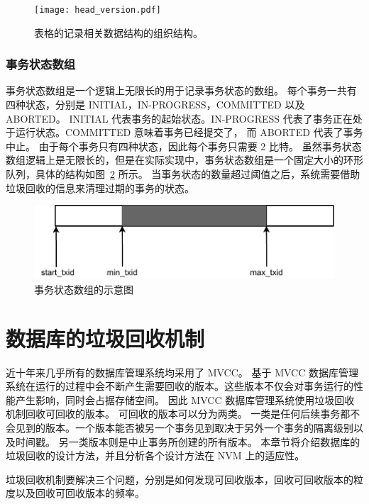 \begin{figure}
    \centering
    \texttt{[image: head\_version.pdf]}
    \caption{表格的记录相关数据结构的组织结构。}
    \label{fig:table}
\end{figure}

\subsubsection{事务状态数组}

事务状态数组是一个逻辑上无限长的用于记录事务状态的数组。
每个事务一共有四种状态，分别是 INITIAL，IN-PROGRESS，COMMITTED 以及 ABORTED。
INITIAL 代表事务的起始状态。IN-PROGRESS 代表了事务正在处于运行状态。COMMITTED 意味着事务已经提交了，
而 ABORTED 代表了事务中止。
由于每个事务只有四种状态，因此每个事务只需要 2 比特。
虽然事务状态数组逻辑上是无限长的，但是在实际实现中，事务状态数组是一个固定大小的环形队列，具体的结构如图~\ref{fig:clog} 所示。
当事务状态的数量超过阈值之后，系统需要借助垃圾回收的信息来清理过期的事务的状态。

\begin{figure}
    \centering
    \includegraphics[width=1\linewidth]{figures/clog.pdf}
    \caption{事务状态数组的示意图}
    \label{fig:clog}
\end{figure}




\section{数据库的垃圾回收机制}

近十年来几乎所有的数据库管理系统均采用了 MVCC。
基于 MVCC 数据库管理系统在运行的过程中会不断产生需要回收的版本。这些版本不仅会对事务运行的性能产生影响，同时会占据存储空间。
因此 MVCC 数据库管理系统使用垃圾回收机制回收可回收的版本。
可回收的版本可以分为两类。
一类是任何后续事务都不会见到的版本。一个版本能否被另一个事务见到取决于另外一个事务的隔离级别以及时间戳。
另一类版本则是中止事务所创建的所有版本。
本章节将介绍数据库的垃圾回收的设计方法，并且分析各个设计方法在 NVM 上的适应性。

垃圾回收机制要解决三个问题，分别是如何发现可回收版本，回收可回收版本的粒度以及回收可回收版本的频率。

